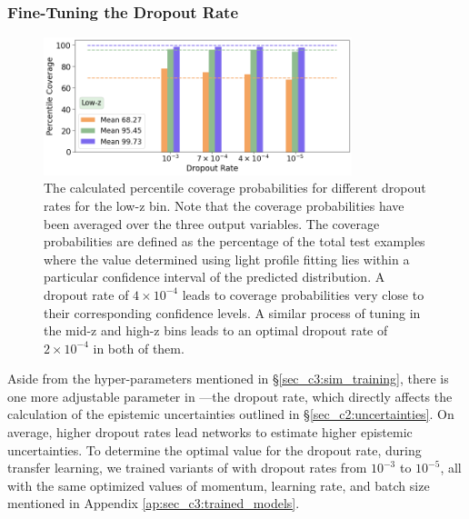 \subsubsection{Fine-Tuning the Dropout Rate} \label{sec_c3:fine_tuning_dropout}

\begin{figure}[htb]
    \centering
    \includegraphics[width = 0.8\textwidth]{dropout_calibration.png}
    \caption{The calculated percentile coverage probabilities for different dropout rates for the low-z bin. Note that the coverage probabilities have been averaged over the three output variables. The coverage probabilities are defined as the percentage of the total test examples where the value determined using light profile fitting lies  within  a  particular confidence interval of the predicted distribution. A dropout rate of $4\times10^{-4}$ leads to coverage probabilities very close to their corresponding confidence levels. A similar process of tuning in the mid-z and high-z bins leads to an optimal dropout rate of $2\times10^{-4}$ in both of them.}
    \label{fig_c3:dropout_calibration}
\end{figure}

Aside from the hyper-parameters mentioned in \S \ref{sec_c3:sim_training}, there is one more adjustable parameter in \gampen{}---the dropout rate, which directly affects the calculation of the epistemic uncertainties outlined in \S \ref{sec_c2:uncertainties}. On average, higher dropout rates lead networks to estimate higher epistemic uncertainties. To determine the optimal value for the dropout rate, during transfer learning, we trained variants of \gampen{} with dropout rates from $10^{-3}$ to $10^{-5}$, all with the same optimized values of momentum, learning rate, and batch size mentioned in Appendix \ref{ap:sec_c3:trained_models}.

